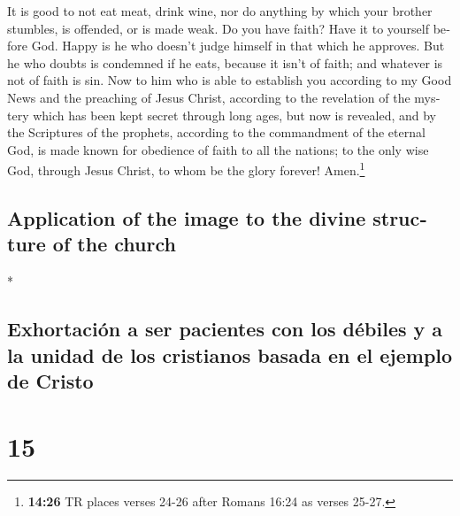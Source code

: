 \begin{paracol}{2}
\begin{otherlanguage}{english}
 It is good to not eat meat, drink wine, nor do anything
by which your brother stumbles, is offended, or is made weak.
 Do you have faith? Have it to yourself before God. Happy
is he who doesn't judge himself in that which he approves.
 But he who doubts is condemned if he eats, because it
isn't of faith; and whatever is not of faith is sin.  Now
to him who is able to establish you according to my Good News and the
preaching of Jesus Christ, according to the revelation of the mystery
which has been kept secret through long ages,  but now is
revealed, and by the Scriptures of the prophets, according to the
commandment of the eternal God, is made known for obedience of faith to
all the nations;  to the only wise God, through Jesus
Christ, to whom be the glory forever! Amen.\footnote{\textbf{14:26} TR
  places verses 24-26 after Romans 16:24 as verses 25-27.}

\hypertarget{application-of-the-image-to-the-divine-structure-of-the-church}{%
\subsection{Application of the image to the divine structure of the
church}\label{application-of-the-image-to-the-divine-structure-of-the-church}}

\end{otherlanguage}

\switchcolumn[0]*

\hypertarget{exhortaciuxf3n-a-ser-pacientes-con-los-duxe9biles-y-a-la-unidad-de-los-cristianos-basada-en-el-ejemplo-de-cristo}{%
\subsection{Exhortación a ser pacientes con los débiles y a la unidad de
los cristianos basada en el ejemplo de
Cristo}\label{exhortaciuxf3n-a-ser-pacientes-con-los-duxe9biles-y-a-la-unidad-de-los-cristianos-basada-en-el-ejemplo-de-cristo}}

\hypertarget{section-28}{%
\section{15}\label{section-28}}


\end{paracol}

